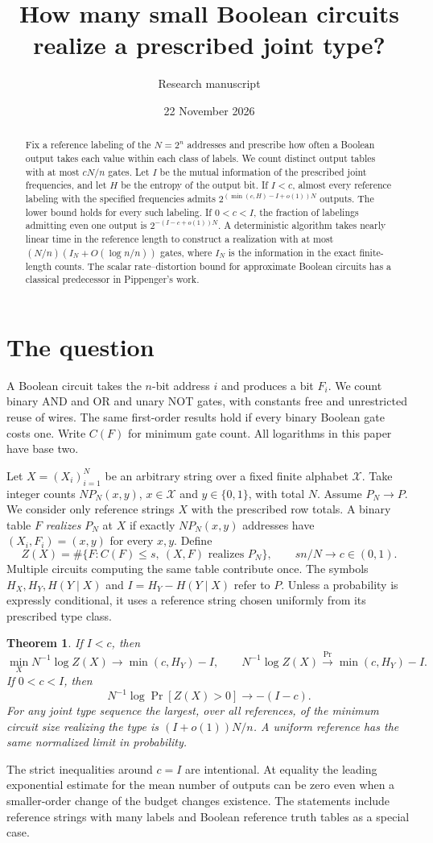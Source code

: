 \documentclass[11pt]{article}
\title{How many small Boolean circuits realize a prescribed joint type?}
\author{Research manuscript}\date{22 November 2026}
\newtheorem{theorem}{Theorem}
\begin{document}
\maketitle
\begin{abstract}
Fix a reference labeling of the $N=2^n$ addresses and prescribe how often a Boolean output takes each value within each class of labels. We count distinct output tables with at most $cN/n$ gates. Let $I$ be the mutual information of the prescribed joint frequencies, and let $H$ be the entropy of the output bit. If $I<c$, almost every reference labeling with the specified frequencies admits $2^{(\min(c,H)-I+o(1))N}$ outputs. The lower bound holds for every such labeling. If $0<c<I$, the fraction of labelings admitting even one output is $2^{-(I-c+o(1))N}$. A deterministic algorithm takes nearly linear time in the reference length to construct a realization with at most $(N/n)(I_N+O(\log n/n))$ gates, where $I_N$ is the information in the exact finite-length counts. The scalar rate--distortion bound for approximate Boolean circuits has a classical predecessor in Pippenger's work.
\end{abstract}

\section{The question}
A Boolean circuit takes the $n$-bit address $i$ and produces a bit $F_i$. We count binary AND and OR and unary NOT gates, with constants free and unrestricted reuse of wires. The same first-order results hold if every binary Boolean gate costs one. Write $C(F)$ for minimum gate count. All logarithms in this paper have base two.

Let $X=(X_i)_{i=1}^N$ be an arbitrary string over a fixed finite alphabet $\mathcal X$. Take integer counts $N P_N(x,y)$, $x\in\mathcal X$ and $y\in\{0,1\}$, with total $N$. Assume $P_N\to P$. We consider only reference strings $X$ with the prescribed row totals. A binary table $F$ \emph{realizes} $P_N$ at $X$ if exactly $NP_N(x,y)$ addresses have $(X_i,F_i)=(x,y)$ for every $x,y$. Define
\[
 Z(X)=\#\{F:C(F)\le s,\ (X,F)\text{ realizes }P_N\},\qquad sn/N\to c\in(0,1).
\]
Multiple circuits computing the same table contribute once. The symbols $H_X,H_Y,H(Y\mid X)$ and $I=H_Y-H(Y\mid X)$ refer to $P$. Unless a probability is expressly conditional, it uses a reference string chosen uniformly from its prescribed type class.
\begin{theorem}\label{t:main}
If $I<c$, then
\[
  \min_X N^{-1}\log Z(X)\longrightarrow \min(c,H_Y)-I,
  \qquad N^{-1}\log Z(X)\xrightarrow{\Pr}\min(c,H_Y)-I .
\]
If $0<c<I$, then
\[
                N^{-1}\log\Pr[Z(X)>0]\longrightarrow -(I-c).
\]
For any joint type sequence the largest, over all references, of the minimum circuit size realizing the type is $(I+o(1))N/n$. A uniform reference has the same normalized limit in probability.
\end{theorem}
The strict inequalities around $c=I$ are intentional. At equality the leading exponential estimate for the mean number of outputs can be zero even when a smaller-order change of the budget changes existence. The statements include reference strings with many labels and Boolean reference truth tables as a special case.
\end{document}
